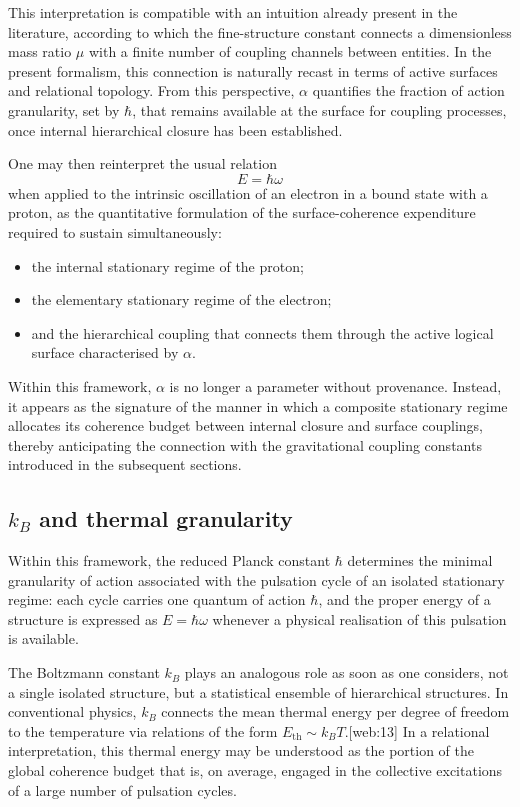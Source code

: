 \documentclass[11pt,a4paper]{article}
\begin{document}
This interpretation is compatible with an intuition already present in the literature, according to which the fine-structure constant connects a dimensionless mass ratio \(\mu\) with a finite number of coupling channels between entities. In the present formalism, this connection is naturally recast in terms of active surfaces and relational topology. From this perspective, \(\alpha\) quantifies the fraction of action granularity, set by \(\hbar\), that remains available at the surface for coupling processes, once internal hierarchical closure has been established.

One may then reinterpret the usual relation
\[
E = \hbar \omega
\]
when applied to the intrinsic oscillation of an electron in a bound state with a proton, as the quantitative formulation of the surface-coherence expenditure required to sustain simultaneously:
\begin{itemize}[label=-]
  \item the internal stationary regime of the proton;
  \item the elementary stationary regime of the electron;
  \item and the hierarchical coupling that connects them through the active logical surface characterised by \(\alpha\).
\end{itemize}
Within this framework, \(\alpha\) is no longer a parameter without provenance. Instead, it appears as the signature of the manner in which a composite stationary regime allocates its coherence budget between internal closure and surface couplings, thereby anticipating the connection with the gravitational coupling constants introduced in the subsequent sections.

\subsection{\texorpdfstring{$k_B$}{kB} and thermal granularity}
Within this framework, the reduced Planck constant \(\hbar\) determines the minimal granularity of action associated with the pulsation cycle of an isolated stationary regime: each cycle carries one quantum of action \(\hbar\), and the proper energy of a structure is expressed as \(E = \hbar \omega\) whenever a physical realisation of this pulsation is available.

The Boltzmann constant \(k_B\) plays an analogous role as soon as one considers, not a single isolated structure, but a statistical ensemble of hierarchical structures. In conventional physics, \(k_B\) connects the mean thermal energy per degree of freedom to the temperature via relations of the form \(E_{\mathrm{th}} \sim k_B T\).[web:13] In a relational interpretation, this thermal energy may be understood as the portion of the global coherence budget that is, on average, engaged in the collective excitations of a large number of pulsation cycles.
\end{document}
